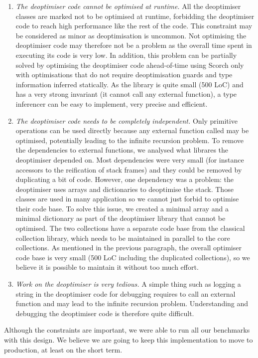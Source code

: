 \documentclass[a4paper,12pt,twoside]{../includes/ThesisStyle}
\begin{document}
\begin{enumerate}
	\item \emph{The deoptimiser code cannot be optimised at runtime.} All the deoptimiser classes are marked not to be optimised at runtime, forbidding the deoptimiser code to reach high performance like the rest of the code. This constraint may be considered as minor as deoptimisation is uncommon. Not optimising the deoptimiser code may therefore not be a problem as the overall time spent in executing its code is very low. In addition, this problem can be partially solved by optimising the deoptimiser code ahead-of-time using Scorch only with optimisations that do not require deoptimisation guards and type information inferred statically. As the library is quite small (500 LoC) and has a very strong invariant (it cannot call any external function), a type inferencer can be easy to implement, very precise and efficient.
	\item \emph{The deoptimiser code needs to be completely independent.} Only primitive operations can be used directly because any external function called may be optimised, potentially leading to the infinite recursion problem. To remove the dependencies to external functions, we analysed what librares the deoptimiser depended on. Most dependencies were very small (for instance accessors to the reification of stack frames) and they could be removed by duplicating a bit of code. However, one dependency was a problem: the deoptimiser uses arrays and dictionaries to deoptimise the stack. Those classes are used in many application so we cannot just forbid to optimise their code base. To solve this issue, we created a minimal array and a minimal dictionary as part of the deoptimiser library that cannot be optimised. The two collections have a separate code base from the classical collection library, which needs to be maintained in parallel to the core collections. As mentioned in the previous paragraph, the overall optimiser code base is very small (500 LoC including the duplicated collections), so we believe it is possible to maintain it without too much effort.
	\item \emph{Work on the deoptimiser is very tedious.} A simple thing such as logging a string in the deoptimiser code for debugging requires to call an external function and may lead to the infinite recursion problem. Understanding and debugging the deoptimiser code is therefore quite difficult.
\end{enumerate}

Although the constraints are important, we were able to run all our benchmarks with this design. We believe we are going to keep this implementation to move to production, at least on the short term.
\end{document}
